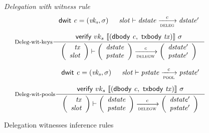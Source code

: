 \begin{figure}
  \emph{Delegation with witness rule}
  \begin{equation}
    \label{eq:deleg-witnesses-keys}
    \inference[Deleg-wit-keys]
    { \dwit{c} = (\var{vk_s}, \sigma)
      & \var{slot} \vdash \var{dstate} \trans{deleg}{c} \var{dstate'}
      \\ ~ \\
      \verify{vk_s}{\serialised{(\dbody{c},~\txbody \var{tx})}}{\sigma}
    }
    { \left(
      \begin{array}{r}
        \var{tx} \\
        \var{slot}
      \end{array}
      \right)
      \vdash
      \left(
      \begin{array}{r}
        \var{dstate} \\
        \var{pstate}
      \end{array}
      \right)
      \trans{delegw}{c}
      \left(
      \begin{array}{rcl}
        \var{dstate'} \\
        \var{pstate'}
      \end{array}
      \right)
    }
  \end{equation}

  \begin{equation}
    \label{eq:deleg-witnesses-pools}
    \inference[Deleg-wit-pools]
    { \dwit{c} = (\var{vk_s}, \sigma)
      & \var{slot} \vdash \var{pstate} \trans{pool}{c} \var{pstate'}
      \\ ~ \\
      \verify{vk_s}{\serialised{(\dbody{c},~\txbody \var{tx})}}{\sigma}
    }
    { \left(
      \begin{array}{r}
        \var{tx} \\
        \var{slot}
      \end{array}
      \right)
      \vdash
      \left(
      \begin{array}{r}
        \var{dstate} \\
        \var{pstate}
      \end{array}
      \right)
      \trans{delegw}{c}
      \left(
      \begin{array}{rcl}
        \var{dstate'} \\
        \var{pstate'}
      \end{array}
      \right)
    }
  \end{equation}
  \caption{Delegation witnesses inference rules}
  \label{fig:rules:delegationw}
\end{figure}

